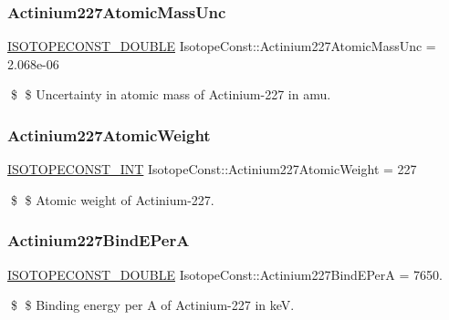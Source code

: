 \subsubsection{\texorpdfstring{Actinium227\+Atomic\+Mass\+Unc}{Actinium227AtomicMassUnc}}
{\footnotesize\ttfamily \mbox{\hyperlink{group___isotope_const-_macros_ga8f45a7272ce02c0b4c65c44636ed719a}{I\+S\+O\+T\+O\+P\+E\+C\+O\+N\+S\+T\+\_\+\+D\+O\+U\+B\+LE}} Isotope\+Const\+::\+Actinium227\+Atomic\+Mass\+Unc = 2.\+068e-\/06}

\$ \$ Uncertainty in atomic mass of Actinium-\/227 in amu. \mbox{\label{group___isotope_const-_actinium-_ac227_ga7376950fef8a92b7343d820d082c81cd}} 
\subsubsection{\texorpdfstring{Actinium227\+Atomic\+Weight}{Actinium227AtomicWeight}}
{\footnotesize\ttfamily \mbox{\hyperlink{group___isotope_const-_macros_ga5f18360b3e99483a35c32d789e62621c}{I\+S\+O\+T\+O\+P\+E\+C\+O\+N\+S\+T\+\_\+\+I\+NT}} Isotope\+Const\+::\+Actinium227\+Atomic\+Weight = 227}

\$ \$ Atomic weight of Actinium-\/227. \mbox{\label{group___isotope_const-_actinium-_ac227_gaacd574246c649592bf24781688283701}} 
\subsubsection{\texorpdfstring{Actinium227\+Bind\+E\+PerA}{Actinium227BindEPerA}}
{\footnotesize\ttfamily \mbox{\hyperlink{group___isotope_const-_macros_ga8f45a7272ce02c0b4c65c44636ed719a}{I\+S\+O\+T\+O\+P\+E\+C\+O\+N\+S\+T\+\_\+\+D\+O\+U\+B\+LE}} Isotope\+Const\+::\+Actinium227\+Bind\+E\+PerA = 7650.}

\$ \$ Binding energy per A of Actinium-\/227 in keV. \mbox{\label{group___isotope_const-_actinium-_ac227_ga33ed4f5904f12861d800f706e7fdd063}} 
